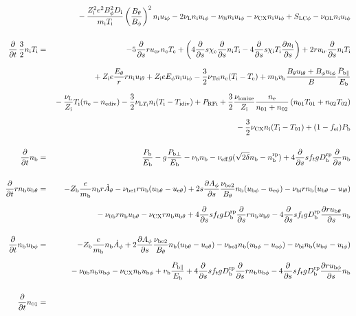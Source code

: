 \documentclass[11pt]{article}
\def\r#1{{\rm#1}}
\def\ddt{\frac{\partial}{\partial t}}
\def\dds{\frac{\partial}{\partial s}}
\def\dd#1{\frac{\partial #1}{\partial s}}
\def\mi{m_\r{i}}
\def\mb{m_\r{b}}
\def\Di{D_\r{i}}
\def\chie{\chi_\r{e}}
\def\chii{\chi_\r{i}}
\def\ne{n_\r{e}}
\def\ni{n_\r{i}}
\def\nb{n_\r{b}}
\def\uer{u_{\r{e}r}}
\def\uir{u_{\r{i}r}}
\def\ueth{u_{\r{e}\theta}}
\def\uith{u_{\r{i}\theta}}
\def\ubth{u_{\r{b}\theta}}
\def\ueph{u_{\r{e}\phi}}
\def\uiph{u_{\r{i}\phi}}
\def\ubph{u_{\r{b}\phi}}
\def\Eth{E_\theta}
\def\Eph{E_\phi}
\def\Bth{B_\theta}
\def\Bph{B_\phi}
\def\Athd{\dot{A}_\theta}
\def\Aphd{\dot{A}_\phi}
\def\Aph{A_\phi}
\def\Te{T_\r{e}}
\def\Ti{T_\r{i}}
\def\nna{n_{01}}
\def\nnb{n_{02}}
\def\Zi{Z_\r{i}}
\def\Zb{Z_\r{b}}
\def\Pb{P_\r{b}}
\def\Eb{E_\r{b}}
\def\PRFi{P_\r{RFi}}
\def\Tna{T_{01}}
\def\Tnb{T_{02}}
\def\fei{f_\r{ei}}
\def\nbrp{n_\r{b}^\r{rp}}
\def\Pbpara{P_{\r{b}\parallel}}
\def\Pbperp{P_{\r{b}\perp}}
\def\nueff{\nu_\r{eff}}
\def\Dbrp{D_\r{b}^\r{rp}}
\def\nuNCi{\nu_\r{NCi}}
\def\nubi{\nu_\r{bi}}
\def\nuni{\nu_\r{0i}}
\def\nunb{\nu_\r{0b}}
\def\nuL{\nu_\r{L}}
\def\nuCX{\nu_\r{CX}}
\def\nuion{\nu_\r{ionize}}
\def\nub{\nu_\r{b}}
\def\nuTei{\nu_\r{Tei}}
\def\vb{v_\r{b}}
\def\nediv{n_\r{ediv}}
\def\Tidiv{T_\r{idiv}}
\def\nuLTi{\nu_{\r{L}T_\r{i}}}
\def\nuOL{\nu_\r{OL}}
\begin{document}
\begin{eqnarray}
\nonumber\\[2.5mm]&&{}
%
  - \frac{\Zi^2 e^2 \Bph^2 \Di}{\mi\Ti}\left(\frac{\Bth}{\Bph}\right)^2\ni\uiph
%
  - 2 \nuL \ni \uiph
%
  - \nuni \ni \uiph
%
  - \nuCX \ni \uiph
%
  + S_\r{LC\phi}
%
  - \nuOL \ni \uiph
%
%
\\[5mm]
%
%
  \ddt \, \frac{3}{2} \ni \Ti &=&
%
  - 5 \dds r \uer \ne \Te
%
  + \left(   4 \dds s \chie \dds \ni \Ti 
%
           - 4 \dds s \chii \Ti \dd{\ni} \right)
%
  + 2 r \uir \dds \ni \Ti
%
\nonumber\\[2.5mm]&&{}
%
  + \Zi e \frac{\Eth}{r} r \ni \uith
%
  + \Zi e \Eph \ni \uiph
%
  - \frac{3}{2} \nuTei \ne (\Ti - \Te)
%
  + \mb \vb \frac{\Bth \uith + \Bph \uiph}{B} \frac{\Pbpara}{\Eb}  
\nonumber\\[2.5mm]&&{}
%
  - \frac{\nuL}{\Zi} \Ti (\ne - \nediv)
%
  - \frac{3}{2} \nuLTi \ni (\Ti - \Tidiv)
%
  + \PRFi
%
  + \frac{3}{2} \frac{\nuion}{\Zi} \frac{\ne}{\nna +\nnb}\, (\nna \Tna +
  \nnb \Tnb)
\nonumber\\[2.5mm]&&{}
%
  - \frac{3}{2} \nuCX \ni (\Ti - \Tna)
%
  + (1 - \fei) \Pb
\\[5mm]
%
%
  \ddt \nb &=&
%
    \frac{\Pb}{\Eb}
%
  - g \frac{\Pbperp}{\Eb}
%
  - \nub \nb
%
  - \nueff g (\sqrt{2\delta}\nb - \nbrp)
%
  + 4 \dds s f_t g \Dbrp \dds \nb
\\[5mm]
%
%
  \ddt r \nb \ubth &=&
%
  - \Zb \frac{e}{\mb} \nb r \Athd
%
%
  - \nu_\r{be1} r \nb (\ubth - \ueth)
%
  + 2 s \dd{\Aph} \frac{\nu_\r{be2}}{\Bth} \nb (\ubph - \ueph)
%
  - \nubi r \nb (\ubth - \uith)
\nonumber\\[2.5mm]&&{}
%
  - \nunb r \nb \ubth
%
  - \nuCX r \nb \ubth
%
  + 4 \dds s f_t g \Dbrp \dds r \nb \ubth
%
  - 4 \dds s f_t g \Dbrp \dd{r\ubth} \nb
\\[5mm]
%
%
  \ddt \nb \ubph &=&
%
  - \Zb \frac{e}{\mb} \nb \Aphd
%
  + 2 \dd{\Aph} \frac{\nu_\r{be2}}{\Bth} \nb (\ubth - \ueth)
%
  - \nu_\r{be3} \nb (\ubph - \ueph)
%
  - \nubi \nb (\ubph - \uiph)
\nonumber\\[2.5mm]&&{}
%
  - \nunb \nb \ubph
%
  - \nuCX \nb \ubph
%
  + \vb \frac{\Pbpara}{\Eb}
%
  + 4 \dds s f_t g \Dbrp \dds r \nb \ubph
%
  - 4 \dds s f_t g \Dbrp \dd{r\ubph} \nb
\\[5mm]
%
%
  \ddt \nna &=& 

\end{eqnarray}
\end{document}
